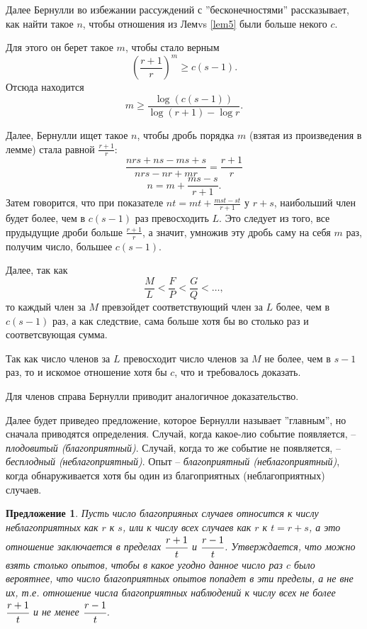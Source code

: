 \documentclass[12pt]{article}
\newtheorem{proposition}{Предложение}
\begin{document}
Далее Бернулли во избежании рассуждений с ''бесконечностями'' рассказывает, как найти такое $n$, чтобы отношения из Лемvs \ref{lem5} были больше некого $c$.

Для этого он берет такое $m$, чтобы стало верным 
$$\left(\frac{r+1}{r}\right)^m \geqslant c (s-1).$$
Отсюда находится $$m \geqslant \frac{\log (c(s-1))}{\log (r+1) - \log r}.$$

Далее, Бернулли ищет такое $n$, чтобы дробь порядка $m$ (взятая из произведения в лемме) стала равной $\frac{r+1}{r}$:
$$\frac{nrs+ns-ms+s}{nrs-nr+mr} = \frac{r+1}{r}$$ 
$$n = m + \frac{ms-s}{r+1}.$$
Затем говорится, что при показателе $nt = mt+\frac{mst-st}{r+1}$ у $r+s$, наибольший член будет более, чем в $c(s-1)$ раз превосходить  $L$.
Это следует из того, все прудыдущие дроби больше $\frac{r+1}{r}$, а значит, умножив эту дробь саму на себя $m$ раз, получим число, большее $c(s-1)$.

Далее, так как $$\frac{M}{L} < \frac{F}{P} < \frac{G}{Q} < \dots,$$
то каждый член за $M$ превзойдет соответствующий член за $L$ более, чем в $c(s-1)$ раз, а как следствие, сама больше хотя бы во столько раз и соответсвующая сумма.

Так как число членов за $L$ превосходит число членов за $M$ не более, чем в $s-1$ раз, то и искомое отношение хотя бы $c$, что и требовалось доказать.

Для членов справа Бернулли приводит аналогичное доказательство.

Далее будет приведео предложение, которое Бернулли называет ''главным'', но сначала приводятся определения.
Случай, когда какое-лио событие появляется, -- \textit{плодовитый (благоприятный)}.
Случай, когда то же событие не появляется, -- \textit{бесплодный (неблагоприятный)}.
Опыт -- \textit{благоприятный (неблагоприятный)}, когда обнаруживается хотя бы один из благоприятных (неблагоприятных) случаев.

\begin{proposition}
Пусть число благоприяных случаев относится к числу неблагоприятных как $r$ к $s$, или к числу всех случаев как $r$  к $t=r+s$, а это отношение заключается в пределах $\cfrac{r+1}{t}$ и $\cfrac{r-1}{t}$.
Утверждается, что можно взять столько опытов, чтобы в какое угодно данное число раз $c$ было вероятнее, что число благоприятных опытов попадет в эти пределы, а не вне их, т.е. отношение числа благоприятных наблюдений к числу всех не более $\cfrac{r+1}{t}$ и не менее $\cfrac{r-1}{t}$.
\end{proposition}
\end{document}
